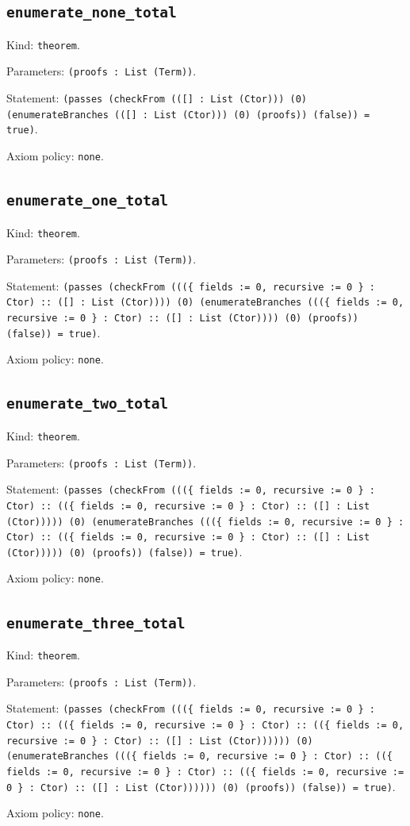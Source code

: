 \documentclass[11pt]{article}
\begin{document}
\subsection*{\texttt{enumerate\_none\_total}}
\noindent Kind: \texttt{theorem}.\par
\noindent Parameters: \texttt{(proofs : List (Term))}.\par
\noindent Statement: \texttt{(passes (checkFrom (([] : List (Ctor))) (0) (enumerateBranches (([] : List (Ctor))) (0) (proofs)) (false)) = true)}.\par
\noindent Axiom policy: \texttt{none}.\par
\subsection*{\texttt{enumerate\_one\_total}}
\noindent Kind: \texttt{theorem}.\par
\noindent Parameters: \texttt{(proofs : List (Term))}.\par
\noindent Statement: \texttt{(passes (checkFrom (((\{ fields := 0, recursive := 0 \} : Ctor) :: ([] : List (Ctor)))) (0) (enumerateBranches (((\{ fields := 0, recursive := 0 \} : Ctor) :: ([] : List (Ctor)))) (0) (proofs)) (false)) = true)}.\par
\noindent Axiom policy: \texttt{none}.\par
\subsection*{\texttt{enumerate\_two\_total}}
\noindent Kind: \texttt{theorem}.\par
\noindent Parameters: \texttt{(proofs : List (Term))}.\par
\noindent Statement: \texttt{(passes (checkFrom (((\{ fields := 0, recursive := 0 \} : Ctor) :: ((\{ fields := 0, recursive := 0 \} : Ctor) :: ([] : List (Ctor))))) (0) (enumerateBranches (((\{ fields := 0, recursive := 0 \} : Ctor) :: ((\{ fields := 0, recursive := 0 \} : Ctor) :: ([] : List (Ctor))))) (0) (proofs)) (false)) = true)}.\par
\noindent Axiom policy: \texttt{none}.\par
\subsection*{\texttt{enumerate\_three\_total}}
\noindent Kind: \texttt{theorem}.\par
\noindent Parameters: \texttt{(proofs : List (Term))}.\par
\noindent Statement: \texttt{(passes (checkFrom (((\{ fields := 0, recursive := 0 \} : Ctor) :: ((\{ fields := 0, recursive := 0 \} : Ctor) :: ((\{ fields := 0, recursive := 0 \} : Ctor) :: ([] : List (Ctor)))))) (0) (enumerateBranches (((\{ fields := 0, recursive := 0 \} : Ctor) :: ((\{ fields := 0, recursive := 0 \} : Ctor) :: ((\{ fields := 0, recursive := 0 \} : Ctor) :: ([] : List (Ctor)))))) (0) (proofs)) (false)) = true)}.\par
\noindent Axiom policy: \texttt{none}.\par
\end{document}
